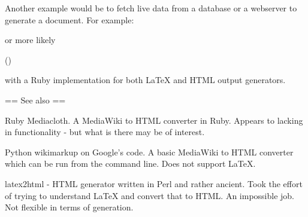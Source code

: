 Another example would be to fetch live data from a database or a
webserver to generate a document. For example:


or more likely

  \userinfo(\username)

with a Ruby implementation for both LaTeX and HTML output generators.


== See also ==

Ruby Mediacloth. A MediaWiki to HTML converter in Ruby. Appears to
lacking in functionality - but what is there may be of interest.

Python wikimarkup on Google's code. A basic MediaWiki to HTML
converter which can be run from the command line. Does not support
LaTeX.

latex2html - HTML generator written in Perl and rather ancient. Took
the effort of trying to understand LaTeX and convert that to HTML. An
impossible job. Not flexible in terms of generation.
